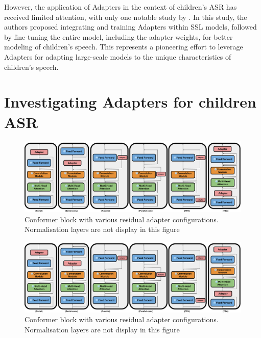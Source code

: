 However, the application of Adapters in the context of children's ASR has received limited attention, with only one notable study by \cite{fan2022draft}. In this study, the authors proposed integrating and training Adapters within SSL models, followed by fine-tuning the entire model, including the adapter weights, for better modeling of children's speech. This represents a pioneering effort to leverage Adapters for adapting large-scale models to the unique characteristics of children's speech.

\section{Investigating Adapters for children ASR}


\begin{figure}[t]
    \begin{center}
    \includegraphics[scale=0.27]{imgs/Adapter_conformer.png}
    \caption{Conformer block with various residual adapter configurations. Normalisation layers are not display in this figure}
    \label{fig:transformer_config}
    \end{center}
\end{figure}
\begin{figure}[t]
    \begin{center}
    \includegraphics[scale=0.27]{imgs/Adapter_conformer.png}
    \caption{Conformer block with various residual adapter configurations. Normalisation layers are not display in this figure}
    \label{fig:conformer_config}
    \end{center}
\end{figure}

